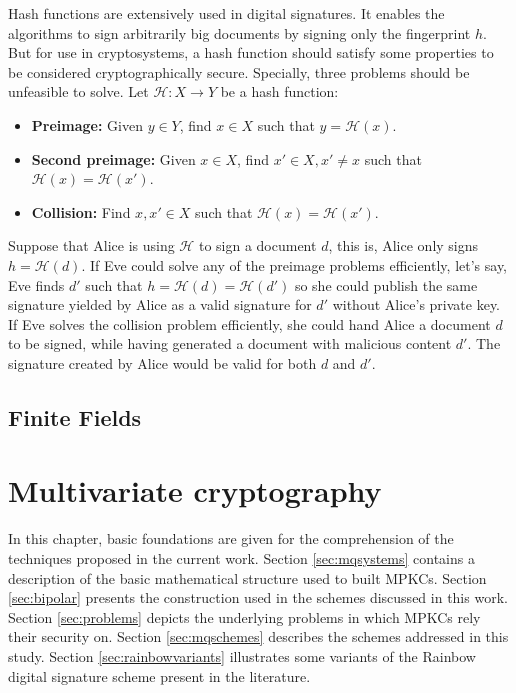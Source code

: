 \documentclass{ufsctex/ufsctex}
\begin{document}
Hash functions are extensively used in digital signatures. It enables the
algorithms to sign arbitrarily big documents by signing only the fingerprint
$h$. But for use in cryptosystems, a hash function should satisfy some
properties to be considered cryptographically secure. Specially, three problems
should be unfeasible to solve. Let $\mathcal{H}:X \rightarrow Y$ be a hash
function:

\begin{itemize}

	\item \textbf{Preimage:} Given $y \in Y$, find $x \in X$ such that $y =
		\mathcal{H}(x)$.

	\item \textbf{Second preimage:} Given $x \in X$, find $x' \in X, x' \ne x$
		such that $\mathcal{H}(x) = \mathcal{H}(x')$.

	\item \textbf{Collision:} Find $x, x' \in X$ such that $\mathcal{H}(x) =
		\mathcal{H}(x')$.

\end{itemize}

Suppose that Alice is using $\mathcal{H}$ to sign a document $d$, this is,
Alice only signs $h = \mathcal{H}(d)$. If Eve could solve any of the preimage
problems efficiently, let's say, Eve finds $d'$ such that $h = \mathcal{H}(d) =
\mathcal{H}(d')$ so she could publish the same signature yielded by Alice as a
valid signature for $d'$ without Alice's private key. If Eve solves the
collision problem efficiently, she could hand Alice a document $d$ to be
signed, while having generated a document with malicious content $d'$. The
signature created by Alice would be valid for both $d$ and $d'$.

\section{Finite Fields}

\chapter{Multivariate cryptography}

In this chapter, basic foundations are given for the comprehension of the
techniques proposed in the current work. Section \ref{sec:mqsystems} contains a
description of the basic mathematical structure used to built MPKCs. Section
\ref{sec:bipolar} presents the construction used in the schemes discussed in
this work. Section \ref{sec:problems} depicts the underlying problems in which
MPKCs rely their security on. Section \ref{sec:mqschemes} describes the schemes
addressed in this study. Section \ref{sec:rainbowvariants} illustrates some
variants of the Rainbow digital signature scheme present in the literature.
\end{document}
